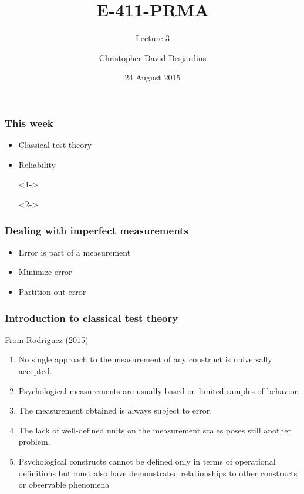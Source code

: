 \documentclass[dvipsnames]{beamer}\usepackage[]{graphicx}\usepackage[]{color}
\title{E-411-PRMA}
\subtitle{Lecture 3}
\author{Christopher David Desjardins}
\date{24 August 2015}
\begin{document}
\begin{frame}
\frametitle{This week}
\begin{itemize}
  \item Classical test theory
  \item Reliability
\end{itemize}
\end{frame}

{
\begin{frame}
\centering
\begin{itemize}
\item[]<1-> \Huge \textcolor{white}{Is there a perfect or exact measurement?}
                           
\vspace{1cm}
\item[]<2->\Huge \textcolor{white}{Must we always deal with error?}
\end{itemize}
\end{frame}
}

\begin{frame}
\frametitle{Dealing with imperfect measurements}
\begin{itemize}
  \item Error is part of a measurement
  \item Minimize error 
  \item Partition out error 
\end{itemize}
\end{frame}

\begin{frame}
\frametitle{Introduction to classical test theory}
From Rodriguez (2015)\footnotemark 
\begin{enumerate}
  \item<1->No single approach to the measurement of any construct is universally accepted.
\item<2->Psychological measurements are usually based on limited samples of behavior.
\item<3->The measurement obtained is always subject to error.
\item<4->The lack of well-defined units on the measurement scales poses still another problem.
\item<5->Psychological constructs cannot be defined only in terms of operational definitions but must also have demonstrated relationships to other constructs or observable phenomena
\end{enumerate}
\end{frame}
\end{document}
